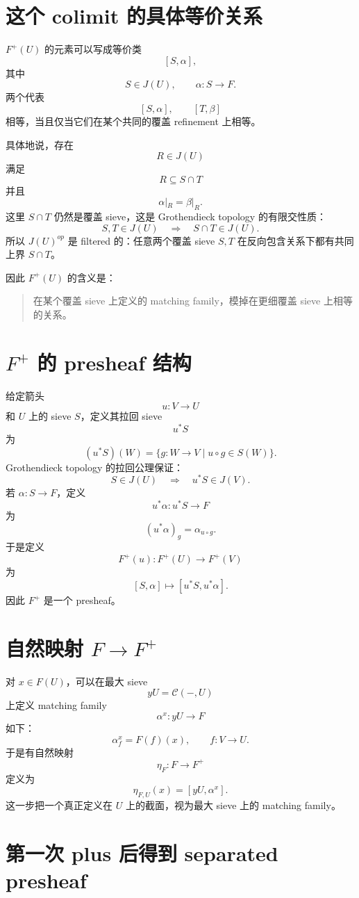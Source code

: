 \documentclass[12pt,a4paper]{article}
\begin{document}
\section{这个 colimit 的具体等价关系}

\(F^+(U)\) 的元素可以写成等价类
\[
[S,\alpha],
\]
其中
\[
S\in J(U),\qquad \alpha:S\to F.
\]
两个代表
\[
[S,\alpha],
\qquad
[T,\beta]
\]
相等，当且仅当它们在某个共同的覆盖 refinement 上相等。

具体地说，存在
\[
R\in J(U)
\]
满足
\[
R\subseteq S\cap T
\]
并且
\[
\alpha|_R=\beta|_R.
\]
这里 \(S\cap T\) 仍然是覆盖 sieve，这是 Grothendieck topology 的有限交性质：
\[
S,T\in J(U)
\quad\Longrightarrow\quad
S\cap T\in J(U).
\]
所以 \(J(U)^{op}\) 是 filtered 的：任意两个覆盖 sieve \(S,T\) 在反向包含关系下都有共同上界 \(S\cap T\)。

因此 \(F^+(U)\) 的含义是：
\begin{quote}
在某个覆盖 sieve 上定义的 matching family，模掉在更细覆盖 sieve 上相等的关系。
\end{quote}

\section{\(F^+\) 的 presheaf 结构}

给定箭头
\[
u:V\to U
\]
和 \(U\) 上的 sieve \(S\)，定义其拉回 sieve
\[
u^*S
\]
为
\[
(u^*S)(W)
=
\{g:W\to V\mid u\circ g\in S(W)\}.
\]
Grothendieck topology 的拉回公理保证：
\[
S\in J(U)
\quad\Longrightarrow\quad
u^*S\in J(V).
\]
若 \(\alpha:S\to F\)，定义
\[
u^*\alpha:u^*S\to F
\]
为
\[
(u^*\alpha)_g
=
\alpha_{u\circ g}.
\]
于是定义
\[
F^+(u):F^+(U)\to F^+(V)
\]
为
\[
[S,\alpha]
\longmapsto
[u^*S,u^*\alpha].
\]
因此 \(F^+\) 是一个 presheaf。

\section{自然映射 \(F\to F^+\)}

对 \(x\in F(U)\)，可以在最大 sieve
\[
yU=\mathcal{C}(-,U)
\]
上定义 matching family
\[
\alpha^x:yU\to F
\]
如下：
\[
\alpha^x_f=F(f)(x),
\qquad f:V\to U.
\]
于是有自然映射
\[
\eta_F:F\to F^+
\]
定义为
\[
\eta_{F,U}(x)
=
[yU,\alpha^x].
\]
这一步把一个真正定义在 \(U\) 上的截面，视为最大 sieve 上的 matching family。

\section{第一次 plus 后得到 separated presheaf}
\end{document}
